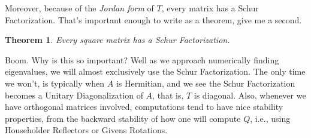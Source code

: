 \documentclass[paper=a4, fontsize=11pt]{scrartcl} %
\newtheorem{theorem}{Theorem}
\numberwithin{equation}{section} %
\numberwithin{figure}{section} %
\numberwithin{table}{section} %
\begin{document}
\begin{enumerate}
Moreover, because of the \emph{Jordan form} of $T$, every matrix has a Schur Factorization. That's important enough to write as a theorem, give me a second. 

\begin{theorem} Every square matrix has a Schur Factorization.
\end{theorem}

Boom. Why is this so important? Well as we approach numerically finding eigenvalues, we will almost exclusively use the Schur Factorization. The only time we won't, is typically when $A$ is Hermitian, and we see the Schur Factorization becomes a Unitary Diagonalization of  $A$, that is, $T$ is diagonal. Also, whenever we have orthogonal matrices involved, computations tend to have nice stability properties, from the backward stability of how one will compute $Q$, i.e., using Householder Reflectors or Givens Rotations. 


\end{enumerate}
\end{document}
